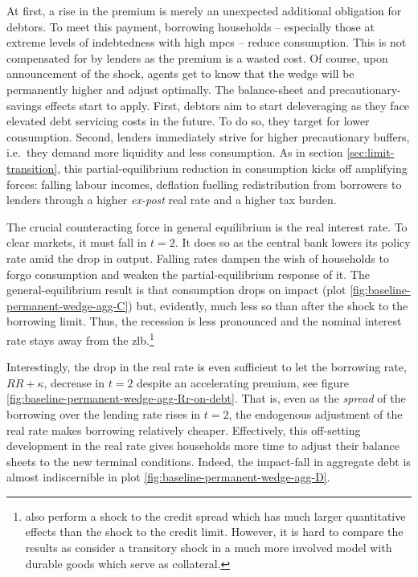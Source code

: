 \documentclass[a4paper,12pt]{article} %
\numberwithin{equation}{section} %
\numberwithin{figure}{section}
\numberwithin{table}{section}
\begin{document}
At first, a rise in the premium is merely an unexpected additional obligation for debtors. To meet this payment, borrowing households -- especially those at extreme levels of indebtedness with high \Gls{mpc}s -- reduce consumption. This is not compensated for by lenders as the premium is a wasted cost. Of course, upon announcement of the shock, agents get to know that the wedge will be permanently higher and adjust optimally. The balance-sheet and precautionary-savings effects start to apply. First, debtors aim to start deleveraging as they face elevated debt servicing costs in the future. To do so, they target for lower consumption. Second, lenders immediately strive for higher precautionary buffers, i.e.~they demand more liquidity and less consumption. As in section \ref{sec:limit-transition}, this partial-equilibrium reduction in consumption kicks off amplifying forces: falling labour incomes, deflation fuelling redistribution from borrowers to lenders through a higher \textit{ex-post} real rate and a higher tax burden. 

The crucial counteracting force in general equilibrium is the real interest rate. To clear markets, it must fall in $t=2$. It does so as the central bank lowers its policy rate amid the drop in output. Falling rates dampen the wish of households to forgo consumption and weaken the partial-equilibrium response of it. The general-equilibrium result is that consumption drops on impact (plot \ref{fig:baseline-permanent-wedge-agg-C}) but, evidently, much less so than after the shock to the borrowing limit. Thus, the recession is less pronounced and the nominal interest rate stays away from the \Gls{zlb}.\footnote{\textcite{gl2017} also perform a shock to the credit spread which has much larger quantitative effects than the shock to the credit limit. However, it is hard to compare the results as \textcite{gl2017} consider a transitory shock in a much more involved model with durable goods which serve as collateral.} 

Interestingly, the drop in the real rate is even sufficient to let the borrowing rate, $RR + \kappa$, decrease in $t=2$ despite an accelerating premium, see figure \ref{fig:baseline-permanent-wedge-agg-Rr-on-debt}. That is, even as the \textit{spread} of the borrowing over the lending rate rises in $t=2$, the endogenous adjustment of the real rate makes borrowing relatively cheaper. Effectively, this off-setting development in the real rate gives households more time to adjust their balance sheets to the new terminal conditions. Indeed, the impact-fall in aggregate debt is almost indiscernible in plot \ref{fig:baseline-permanent-wedge-agg-D}. 
\end{document}
